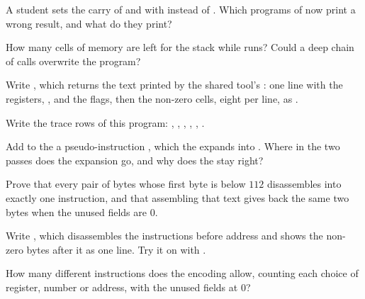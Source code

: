 \begin{exercise}[$\star\star$]\label{exo:g11:project-toy-machine:8}
A student sets the carry of  and  with  instead of . Which programs of
 now print a wrong result, and what do they print?
\end{exercise}

\begin{exercise}[$\star\star$]\label{exo:g11:project-toy-machine:9}
How many cells of memory are left for the stack while  runs? Could a deep chain of calls
overwrite the program?
\end{exercise}

\begin{exercise}[$\star\star$]\label{exo:g11:project-toy-machine:10}
Write , which returns the text printed by the shared tool's : one line with the
registers, ,  and the flags, then the non-zero cells, eight per line, as .
\end{exercise}

\begin{exercise}[$\star\star$]\label{exo:g11:project-toy-machine:11}
Write the trace rows of this program: , , , ,
, .
\end{exercise}

\begin{exercise}[$\star\star\star$]\label{exo:g11:project-toy-machine:12}
Add to the  a pseudo-instruction , which the  expands into . Where in the
two passes does the expansion go, and why does the  stay right?
\end{exercise}

\begin{exercise}[$\star\star\star$]\label{exo:g11:project-toy-machine:13}
Prove that every pair of bytes whose first byte is below $112$ disassembles into exactly one instruction, and that
assembling that text gives back the same two bytes when the unused fields are $0$.
\end{exercise}

\begin{exercise}[$\star\star\star$]\label{exo:g11:project-toy-machine:14}
Write , which disassembles the instructions before address  and
shows the non-zero bytes after it as one  line. Try it on  with .
\end{exercise}

\begin{exercise}[$\star\star\star$]\label{exo:g11:project-toy-machine:15}
How many different instructions does the encoding allow, counting each choice of register, number or address, with
the unused fields at $0$?
\end{exercise}
